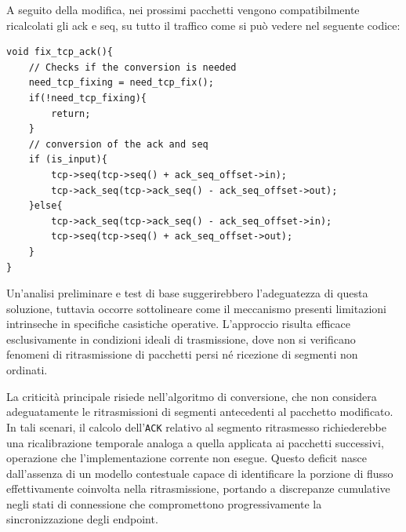 A seguito della modifica, nei prossimi pacchetti vengono compatibilmente ricalcolati gli ack e seq, su tutto il traffico come si può vedere nel seguente codice:

\begin{listing}[H]
    \begin{verbatim}
void fix_tcp_ack(){
    // Checks if the conversion is needed
    need_tcp_fixing = need_tcp_fix();
    if(!need_tcp_fixing){
        return;
    }
    // conversion of the ack and seq
    if (is_input){
        tcp->seq(tcp->seq() + ack_seq_offset->in);
        tcp->ack_seq(tcp->ack_seq() - ack_seq_offset->out);
    }else{
        tcp->ack_seq(tcp->ack_seq() - ack_seq_offset->in);
        tcp->seq(tcp->seq() + ack_seq_offset->out);
    }
}
\end{verbatim}
\end{listing}


Un'analisi preliminare e test di base suggerirebbero l'adeguatezza di questa soluzione, tuttavia occorre sottolineare come il meccanismo presenti limitazioni intrinseche in specifiche casistiche operative. L'approccio risulta efficace esclusivamente in condizioni ideali di trasmissione, dove non si verificano fenomeni di ritrasmissione di pacchetti persi né ricezione di segmenti non ordinati.

La criticità principale risiede nell'algoritmo di conversione, che non considera adeguatamente le ritrasmissioni di segmenti antecedenti al pacchetto modificato.
In tali scenari, il calcolo dell'\texttt{ACK} relativo al segmento ritrasmesso richiederebbe una ricalibrazione temporale analoga a quella applicata ai pacchetti successivi,
operazione che l'implementazione corrente non esegue. Questo deficit nasce dall'assenza di un modello contestuale capace di identificare la porzione di flusso effettivamente
coinvolta nella ritrasmissione, portando a discrepanze cumulative negli stati di connessione che compromettono progressivamente la sincronizzazione degli endpoint.

